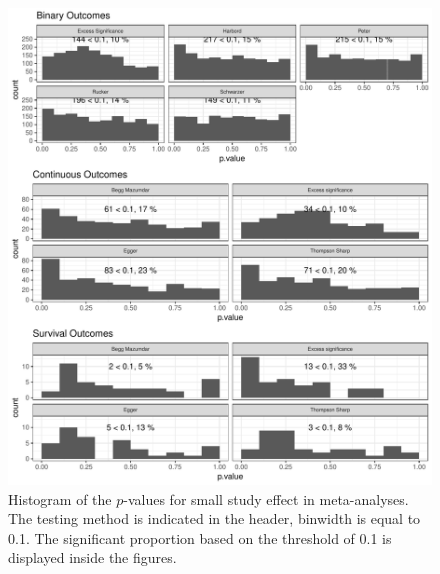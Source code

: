 \documentclass[11pt,a4paper,twoside]{book}\usepackage[]{graphicx}\usepackage[]{color}
\newenvironment{knitrout}{}{} %
\begin{document}
\begin{figure}[ht!]
\begin{knitrout}
\color{fgcolor}

{\centering \includegraphics[width=\textwidth-3cm]{figure/ch03_figunnamed-chunk-10-1} 

}



\end{knitrout}
\caption{Histogram of the $p$-values for small study effect in meta-analyses. The testing method is indicated in the header, binwidth is equal to 0.1. The significant proportion based on the threshold of 0.1 is displayed inside the figures.}
\label{fig:test}
\end{figure}
\end{document}
